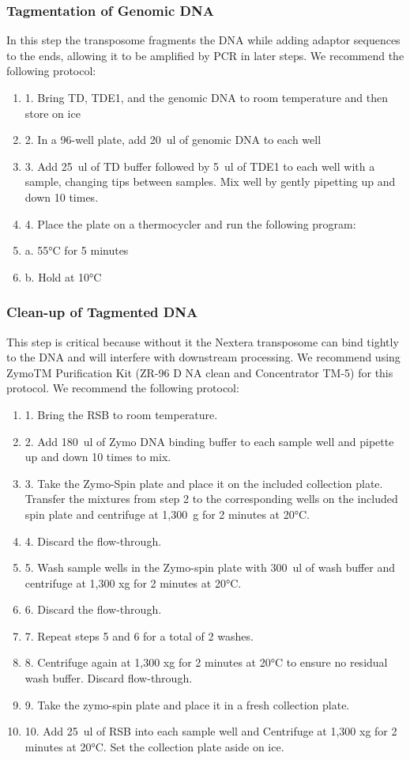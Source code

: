 \documentclass[graybox]{svmult}
\begin{document}
\subsubsection{Tagmentation of Genomic DNA}

In this step the transposome fragments the DNA while adding adaptor sequences to the ends, allowing it to be amplified by PCR in later steps.
We recommend the following protocol:
\begin{enumerate}
\item{1.      Bring TD, TDE1, and the genomic DNA to room temperature and then store on ice}
\item{2.      In a 96-well plate, add 20~ul of genomic DNA to each well}
\item{3.      Add 25~ul of TD buffer followed by 5~ul of TDE1 to each well with a sample, changing tips between samples. Mix well by gently pipetting up and down 10 times.}
\item{4.      Place the plate on a thermocycler and run the following program:}
\item{a.      55°C for 5 minutes}
\item{b.      Hold at 10°C}
\end{enumerate}


\subsubsection{Clean-up of Tagmented DNA}

This step is critical because without it the Nextera transposome can bind tightly to the DNA and will interfere with downstream processing.  We recommend using ZymoTM Purification Kit (ZR-96 D
NA clean and Concentrator TM-5) for this protocol. We recommend the following protocol:
\begin{enumerate}
\item{1.      Bring the RSB to room temperature.}
\item{2.      Add 180~ul of Zymo DNA binding buffer to each sample well and pipette up and down 10 times to mix.}
\item{3.       Take the Zymo-Spin plate and place it on the included collection plate. Transfer the mixtures from step 2 to the corresponding wells on the included spin plate and centrifuge at 1,300~g for 2 minutes at 20°C.}
\item{4.      Discard the flow-through.}
\item{5.      Wash sample wells in the Zymo-spin plate with 300~ul of wash buffer and centrifuge at 1,300 xg for 2 minutes at 20°C.}
\item{6.      Discard the flow-through.}
\item{7.      Repeat steps 5 and 6 for a total of 2 washes.}
\item{8.      Centrifuge again at 1,300 xg for 2 minutes at 20°C to ensure no residual wash buffer. Discard flow-through.}
\item{9.      Take the zymo-spin plate and place it in a fresh collection plate.}
\item{10.     Add 25~ul of RSB into each sample well and Centrifuge at 1,300 xg for 2 minutes at 20°C. Set the collection plate aside on ice.}
\end{enumerate}
\end{document}
